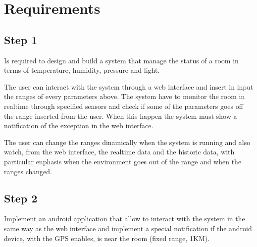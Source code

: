 \section{Requirements}

\subsection{Step 1}

Is required to design and build a system that manage the status of a room in terms of temperature, humidity, pressure and light.

The user can interact with the system through a web interface and insert in input the ranges of every parameters above. The system have to monitor the room in realtime through specified sensors and check if some of the parameters goes off the range inserted from the user. When this happen the system must show a notification of the exception in the web interface.

The user can change the ranges dinamically when the system is running and also watch, from the web interface, the realtime data and the historic data, with particular enphasis when the environment goes out of the range and when the ranges changed.

\subsection{Step 2}

Implement an android application that allow to interact with the system in the same way as the web interface and implement a special notification if the android device, with the GPS enables, is near the room (fixed range, 1KM).
